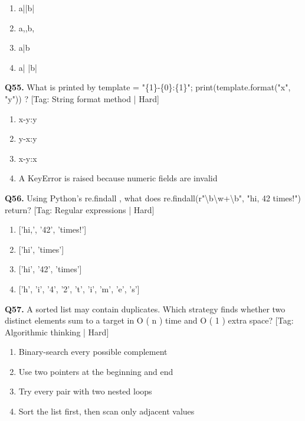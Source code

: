 \begin{enumerate}[label=(\alph*),topsep=2pt,itemsep=1pt,partopsep=0pt,parsep=0pt]
    \item {a||b|}
    \item {a,,b,}
    \item {a|b}
    \item {a| |b|}
\end{enumerate}
\vspace{2mm}
\noindent\textbf{Q55.} What is printed by template = "\{1\}-\{0\}:\{1\}"; print(template.format("x", "y")) ? \hfill [Tag: String format method | Hard]
\begin{enumerate}[label=(\alph*),topsep=2pt,itemsep=1pt,partopsep=0pt,parsep=0pt]
    \item {x-y:y}
    \item {y-x:y}
    \item {x-y:x}
    \item {A KeyError is raised because numeric fields are invalid}
\end{enumerate}
\vspace{2mm}
\noindent\textbf{Q56.} Using Python's re.findall , what does re.findall(r"\textbackslash{}b\textbackslash{}w+\textbackslash{}b", "hi, 42 times!") return? \hfill [Tag: Regular expressions | Hard]
\begin{enumerate}[label=(\alph*),topsep=2pt,itemsep=1pt,partopsep=0pt,parsep=0pt]
    \item {['hi,', '42', 'times!']}
    \item {['hi', 'times']}
    \item {['hi', '42', 'times']}
    \item {['h', 'i', '4', '2', 't', 'i', 'm', 'e', 's']}
\end{enumerate}
\vspace{2mm}
\noindent\textbf{Q57.} A sorted list may contain duplicates. Which strategy finds whether two distinct elements sum to a target in O ( n ) time and O ( 1 ) extra space? \hfill [Tag: Algorithmic thinking | Hard]
\begin{enumerate}[label=(\alph*),topsep=2pt,itemsep=1pt,partopsep=0pt,parsep=0pt]
    \item {Binary-search every possible complement}
    \item {Use two pointers at the beginning and end}
    \item {Try every pair with two nested loops}
    \item {Sort the list first, then scan only adjacent values}
\end{enumerate}
